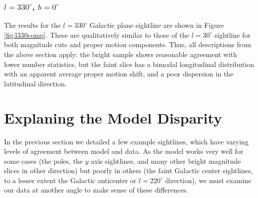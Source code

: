 \documentclass[fleqn,usenatbib]{mnras}
\begin{document}
\subsubsection{$l = 330^\circ$, $b = 0^\circ$}
The results for the $l = 330^\circ$ Galactic plane sightline are shown in Figure \ref{fig:l330comp}. These are qualitatively similar to those of the $l = 30^\circ$ sightline for both magnitude cuts and proper motion components. Thus, all descriptions from the above section apply: the bright sample shows reasonable agreement with lower number statistics, but the faint slice has a bimodal longitudinal distribution with an apparent average proper motion shift, and a poor dispersion in the latitudinal direction.

\section{Explaning the Model Disparity}
In the previous section we detailed a few example sightlines, which have varying levels of agreement between model and data. As the model works very well for some cases (the poles, the $y$ axis sightlines, and many other bright magnitude slices in other direction) but poorly in others (the faint Galactic center sightlines, to a lesser extent the Galactic anticenter or $l = 220^\circ$ direction), we must examine our data at another angle to make sense of these differences.
\end{document}
